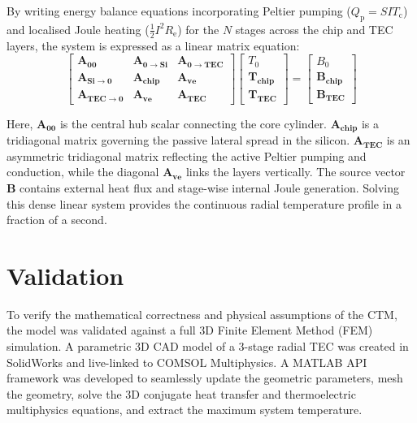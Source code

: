 \documentclass[conference,a4paper]{IEEEtran}
\begin{document}
By writing energy balance equations incorporating Peltier pumping ($Q_{\text{p}} = S I T_{\text{c}}$) and localised Joule heating ($\frac{1}{2} I^2 R_{\text{e}}$) for the $N$ stages across the chip and TEC layers, the system is expressed as a linear matrix equation:
\begin{equation}
	\begin{bmatrix}
		\mathbf{A_{00}}               & \mathbf{A_{0 \to \text{Si}}} & \mathbf{A_{0 \to \text{TEC}}} \\
		\mathbf{A_{\text{Si} \to 0}}  & \mathbf{A_{\text{chip}}}     & \mathbf{A_{\text{ve}}}        \\
		\mathbf{A_{\text{TEC} \to 0}} & \mathbf{A_{\text{ve}}}       & \mathbf{A_{\text{TEC}}}
	\end{bmatrix}
	\begin{bmatrix}
		T_{0} \\ \mathbf{T_{\text{chip}}} \\ \mathbf{T_{\text{TEC}}}
	\end{bmatrix} =
	\begin{bmatrix}
		B_0 \\ \mathbf{B_{\text{chip}}} \\ \mathbf{B_{\text{TEC}}}
	\end{bmatrix}
\end{equation}

Here, $\mathbf{A_{00}}$ is the central hub scalar connecting the core cylinder. $\mathbf{A_{\text{chip}}}$ is a tridiagonal matrix governing the passive lateral spread in the silicon. $\mathbf{A_{\text{TEC}}}$ is an asymmetric tridiagonal matrix reflecting the active Peltier pumping and conduction, while the diagonal $\mathbf{A_{\text{ve}}}$ links the layers vertically. The source vector $\mathbf{B}$ contains external heat flux and stage-wise internal Joule generation. Solving this dense linear system provides the continuous radial temperature profile in a fraction of a second.

\section{Validation}

To verify the mathematical correctness and physical assumptions of the CTM, the model was validated against a full 3D Finite Element Method (FEM) simulation. A parametric 3D CAD model of a 3-stage radial TEC was created in SolidWorks and live-linked to COMSOL Multiphysics. A MATLAB API framework was developed to seamlessly update the geometric parameters, mesh the geometry, solve the 3D conjugate heat transfer and thermoelectric multiphysics equations, and extract the maximum system temperature.
\end{document}
